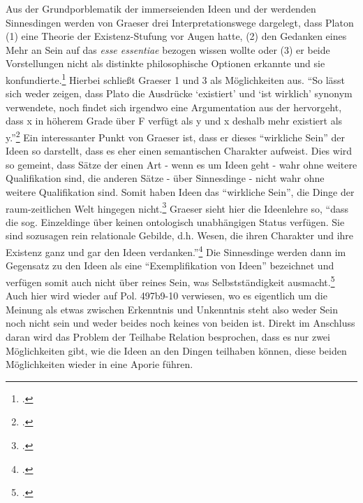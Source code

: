 Aus der Grundporblematik der immerseienden Ideen und der werdenden Sinnesdingen werden von Graeser drei Interpretationswege dargelegt, dass Platon (1) eine Theorie der Existenz-Stufung vor Augen hatte, (2) den Gedanken eines Mehr an Sein auf das \emph{esse essentiae} bezogen wissen wollte oder (3) er beide Vorstellungen nicht als distinkte philosophische Optionen erkannte und sie konfundierte.\footcite[vgl.][S. 140]{GraeserPhiloGeschichte} Hierbei schließt Graeser 1 und 3 als Möglichkeiten aus.
\enquote{So lässt sich weder zeigen, dass Plato die Ausdrücke \enquote{existiert} und \enquote{ist wirklich} synonym verwendete, noch findet sich irgendwo eine Argumentation aus der hervorgeht, dass x in höherem Grade über F verfügt als y und x deshalb mehr existiert als y.}\footcite[][S. 140]{GraeserPhiloGeschichte}
Ein interessanter Punkt von Graeser ist, dass er dieses \enquote{wirkliche Sein} der Ideen so darstellt, dass es eher einen semantischen Charakter aufweist. Dies wird so gemeint, dass Sätze der einen Art - wenn es um Ideen geht - wahr ohne weitere Qualifikation sind, die anderen Sätze - über Sinnesdinge - nicht wahr ohne weitere Qualifikation sind. Somit haben Ideen das \enquote{wirkliche Sein}, die Dinge der raum-zeitlichen Welt hingegen nicht.\footcite[vgl.][S. 141]{GraeserPhiloGeschichte}
Graeser sieht hier die Ideenlehre so, \enquote{dass die sog. Einzeldinge über keinen ontologisch unabhängigen Status verfügen. Sie sind sozusagen rein relationale Gebilde, d.h. Wesen, die ihren Charakter und ihre Existenz ganz und gar den Ideen verdanken.}\footcite[][S. 145]{GraeserPhiloGeschichte}
Die Sinnesdinge werden dann im Gegensatz zu den Ideen als eine \enquote{Exemplifikation von Ideen} bezeichnet und verfügen somit auch nicht über reines Sein, was Selbstständigkeit ausmacht.\footcite[vgl.][S. 146]{GraeserPhiloGeschichte}
Auch hier wird wieder auf Pol. 497b9-10 verwiesen, wo es eigentlich um die Meinung als etwas zwischen Erkenntnis und Unkenntnis steht also weder Sein noch nicht sein und weder beides noch keines von beiden ist.
Direkt im Anschluss daran wird das Problem der Teilhabe Relation besprochen, dass es nur zwei Möglichkeiten gibt, wie die Ideen an den Dingen teilhaben können, diese beiden Möglichkeiten wieder in eine Aporie führen.

